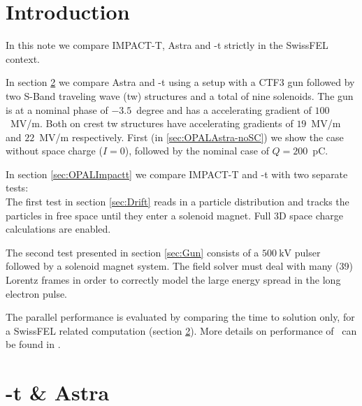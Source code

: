 \documentclass{psi-note}    %
\begin{document}
 
\section{Introduction}

In this note we compare IMPACT-T, Astra and \opal-t strictly in the SwissFEL
context.

In section \ref{sec:OPALAstra} we compare Astra and \opal-t using a setup
with a CTF3 gun \cite{CTF3Gun} followed by two S-Band traveling wave (tw)
structures and a total of nine solenoids. The gun is at a nominal phase of $-3.5$~degree and has a
accelerating gradient of $100$~MV/m. Both on crest tw structures have
accelerating gradients of $19$~MV/m and $22$~MV/m respectively. First (in \ref{sec:OPALAstra-noSC}) we show the case without space charge ($I=0$), followed by
the nominal case of $Q=200$~pC.

In section \ref{sec:OPALImpactt} we compare IMPACT-T and \opal-t with two
separate tests:\\ 
The first test in section \ref{sec:Drift} reads in a particle distribution and
tracks the particles in free space until they enter a solenoid magnet. Full 3D
space charge calculations are enabled.

The second test presented in section \ref{sec:Gun} consists of a $500~\mbox{kV}$ 
pulser followed by a solenoid magnet system. The field solver must deal with
many (39) Lorentz frames in order to correctly model the large energy spread in
the long electron pulse.

The parallel performance is evaluated by comparing the time
to solution only, for a SwissFEL related computation (section
\ref{sec:OPALAstra}). More details on performance of \opal\ can be found in
\cite{PhysRevSTAB.13.064201,Adelmann20104554}.

\section{\opal-t \& Astra} \label{sec:OPALAstra}
\end{document}
